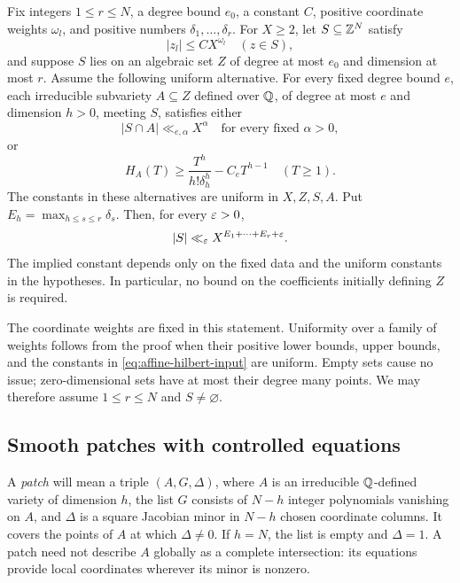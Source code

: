 \begin{theorem}\label{thm:affine-counting}
Fix integers $1\le r\le N$, a degree bound $e_0$, a constant $C$, positive coordinate
weights $\omega_l$, and positive numbers $\delta_1,\ldots,\delta_r$.
For $X\ge2$, let $S\subseteq\mathbb Z^N$ satisfy
\[
 |z_l|\le C X^{\omega_l}\quad(z\in S),
\]
and suppose $S$ lies on an algebraic set $Z$ of degree at most $e_0$
and dimension at most $r$.  Assume the following uniform alternative.
For every fixed degree bound $e$, each irreducible subvariety
$A\subseteq Z$ defined over $\mathbb Q$, of degree at most $e$ and dimension
$h>0$, meeting $S$, satisfies either
\begin{equation}\label{eq:affine-exception}
 |S\cap A|\ll_{e,\alpha} X^\alpha
 \quad\text{for every fixed }\alpha>0,
\end{equation}
or
\begin{equation}\label{eq:affine-hilbert-input}
 H_A(T)\ge \frac{T^h}{h!\delta_h^h}-C_eT^{h-1}
 \quad(T\ge1).
\end{equation}
The constants in these alternatives are uniform in $X,Z,S,A$.
Put $E_h=\max_{h\le s\le r}\delta_s$.  Then, for every $\varepsilon>0$,
\begin{equation}\label{eq:affine-counting-conclusion}
 |S|\ll_\varepsilon X^{E_1+\cdots+E_r+\varepsilon}.
\end{equation}
The implied constant depends only on the fixed data and the uniform
constants in the hypotheses.  In particular, no bound on the
coefficients initially defining $Z$ is required.
\end{theorem}

The coordinate weights are fixed in this statement.  Uniformity over a
family of weights follows from the proof when their positive lower
bounds, upper bounds, and the constants in
\eqref{eq:affine-hilbert-input} are uniform.  Empty sets cause no issue;
zero-dimensional sets have at most their degree many points.  We may
therefore assume $1\le r\le N$ and $S\ne\varnothing$.

\subsection{Smooth patches with controlled equations}

A \emph{patch} will mean a triple $(A,G,\Delta)$, where $A$ is an
irreducible $\mathbb Q$-defined variety of dimension $h$, the list $G$ consists
of $N-h$ integer polynomials vanishing on $A$, and $\Delta$ is a square
Jacobian minor in $N-h$ chosen coordinate columns.  It covers the points
of $A$ at which $\Delta\ne0$.  If $h=N$, the list is empty and
$\Delta=1$.  A patch need not describe $A$ globally as a complete
intersection: its equations provide local coordinates wherever its
minor is nonzero.

